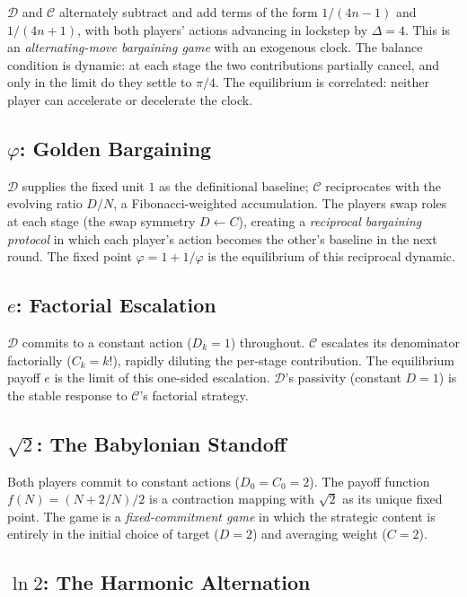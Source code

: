 \documentclass[12pt]{article}
\theoremstyle{definition}
\theoremstyle{remark}
\begin{document}
$\mathcal{D}$ and $\mathcal{C}$ alternately subtract and add terms of the form
$1/(4n-1)$ and $1/(4n+1)$, with both players' actions advancing in lockstep by
$\Delta = 4$.  This is an \emph{alternating-move bargaining game} with an exogenous
clock.  The balance condition is dynamic: at each stage the two contributions partially
cancel, and only in the limit do they settle to $\pi/4$.  The equilibrium is correlated:
neither player can accelerate or decelerate the clock.

\subsection{\texorpdfstring{$\varphi$}{phi}: Golden Bargaining}

$\mathcal{D}$ supplies the fixed unit $1$ as the definitional baseline; $\mathcal{C}$
reciprocates with the evolving ratio $D/N$, a Fibonacci-weighted accumulation.  The
players swap roles at each stage (the swap symmetry $D \leftarrow C$), creating a
\emph{reciprocal bargaining protocol} in which each player's action becomes the other's
baseline in the next round.  The fixed point $\varphi = 1 + 1/\varphi$ is the
equilibrium of this reciprocal dynamic.

\subsection{\texorpdfstring{$e$}{e}: Factorial Escalation}

$\mathcal{D}$ commits to a constant action ($D_k = 1$) throughout.  $\mathcal{C}$
escalates its denominator factorially ($C_k = k!$), rapidly diluting the per-stage
contribution.  The equilibrium payoff $e$ is the limit of this one-sided escalation.
$\mathcal{D}$'s passivity (constant $D = 1$) is the stable response to $\mathcal{C}$'s
factorial strategy.

\subsection{\texorpdfstring{$\sqrt{2}$}{sqrt(2)}: The Babylonian Standoff}

Both players commit to constant actions ($D_0 = C_0 = 2$).  The payoff function
$f(N) = (N + 2/N)/2$ is a contraction mapping with $\sqrt{2}$ as its unique fixed
point.  The game is a \emph{fixed-commitment game} in which the strategic content is
entirely in the initial choice of target ($D = 2$) and averaging weight ($C = 2$).

\subsection{\texorpdfstring{$\ln 2$}{ln 2}: The Harmonic Alternation}
\end{document}
